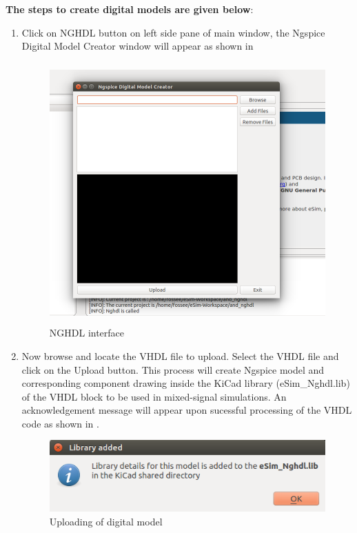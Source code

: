 \noindent \textbf{The steps to create digital models are given below}:

\begin{enumerate}
\item Click on NGHDL button on left side pane of main window, the Ngspice Digital Model Creator window will appear as shown in  
        \begin{figure}[!htp]
            \centering
            \includegraphics[height=10cm, width =\lgfig]{./NGHDL/screen3.png}
            \caption{NGHDL interface}
            \label{screen3}
        \end{figure}


\item Now browse and locate the VHDL file to upload. Select the VHDL file and click on the Upload button. This process will create Ngspice model and corresponding component drawing inside the KiCad library (eSim\_Nghdl.lib) of the VHDL block to be used in mixed-signal simulations. An acknowledgement message will appear upon sucessful processing of the VHDL code as shown in . \\

        \begin{figure}[!htp]
            \centering
            \includegraphics[width =\smfig]{./NGHDL/screen4.png}
            \caption{Uploading of digital model}
            \label{upload}
         \end{figure}
         

\end{enumerate}
